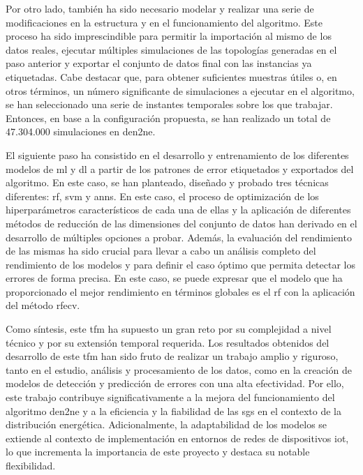 \vspace{3mm}

Por otro lado, también ha sido necesario modelar y realizar una serie de modificaciones en la estructura y en el funcionamiento del algoritmo. Este proceso ha sido imprescindible para permitir la importación al mismo de los datos reales, ejecutar múltiples simulaciones de las topologías generadas en el paso anterior y exportar el conjunto de datos final con las instancias ya etiquetadas. Cabe destacar que, para obtener suficientes muestras útiles o, en otros términos, un número significante de simulaciones a ejecutar en el algoritmo, se han seleccionado una serie de instantes temporales sobre los que trabajar. Entonces, en base a la configuración propuesta, se han realizado un total de 47.304.000 simulaciones en \gls{den2ne}.

\vspace{3mm}

El siguiente paso ha consistido en el desarrollo y entrenamiento de los diferentes modelos de \gls{ml} y \gls{dl} a partir de los patrones de error etiquetados y exportados del algoritmo. En este caso, se han planteado, diseñado y probado tres técnicas diferentes: \gls{rf}, \gls{svm} y \gls{ann}s. En este caso, el proceso de optimización de los hiperparámetros característicos de cada una de ellas y la aplicación de diferentes métodos de reducción de las dimensiones del conjunto de datos han derivado en el desarrollo de múltiples opciones a probar. Además, la evaluación del rendimiento de las mismas ha sido crucial para llevar a cabo un análisis completo del rendimiento de los modelos y para definir el caso óptimo que permita detectar los errores de forma precisa. En este caso, se puede expresar que el modelo que ha proporcionado el mejor rendimiento en términos globales es el \gls{rf} con la aplicación del método \gls{rfecv}.

\vspace{3mm}

Como síntesis, este \gls{tfm} ha supuesto un gran reto por su complejidad a nivel técnico y por su extensión temporal requerida. Los resultados obtenidos del desarrollo de este \gls{tfm} han sido fruto de realizar un trabajo amplio y riguroso, tanto en el estudio, análisis y procesamiento de los datos, como en la creación de modelos de detección y predicción de errores con una alta efectividad. Por ello, este trabajo contribuye significativamente a la mejora del funcionamiento del algoritmo \gls{den2ne} y a la eficiencia y la fiabilidad de las \gls{sg}s en el contexto de la distribución energética. Adicionalmente, la adaptabilidad de los modelos se extiende al contexto de implementación en entornos de redes de dispositivos \gls{iot}, lo que incrementa la importancia de este proyecto y destaca su notable flexibilidad.

